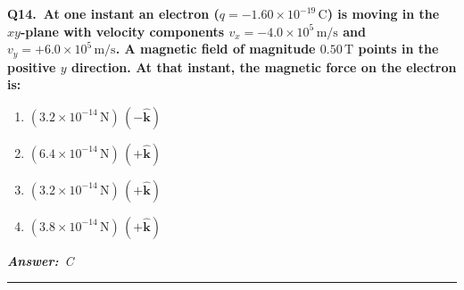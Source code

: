 \documentclass[11pt]{article}
\newcommand{\QuestionStyle}[1]{{\large\bfseries\boldmath #1}}
\newcommand{\AnswerStyle}[1]{{\large\bfseries\boldmath #1}}
\newcommand{\ReasonStyle}[1]{{\normalsize #1}}
\newif\ifshowreason
\newcommand{\Correct}[2]{%
  \item \AnswerStyle{\textcolor{AnsRed}{#1}}%
  \ifshowreason\\[-0.2em]
    \ReasonStyle{\textcolor{AnsRed}{#2}}%
  \fi
}
\newcommand{\Wrong}[2]{%
  \item \AnswerStyle{\textcolor{WrongBlue}{#1}}%
  \ifshowreason\\[-0.2em]
    \ReasonStyle{\textcolor{WrongBlue}{#2}}%
  \fi
}
\newcommand{\QBlock}[4]{%
  \Needspace{8\baselineskip}%
  \noindent
  \begin{minipage}{\linewidth}
    \QuestionStyle{#1.~#2}

    \vspace{0.25em}
    \begin{enumerate}
      #3
    \end{enumerate}

    \vspace{0.1em}
    \noindent\textcolor{AnsRed}{\textit{\textbf{Answer:}~#4}}

    \vspace{0.25em}
    \hrule height 0.4pt
  \end{minipage}
  \vspace{0.75em}
}
\begin{document}
\QBlock{Q14}{At one instant an electron ($q=-1.60\times10^{-19}\,\text{C}$) is moving in the $xy$-plane with velocity components $v_x=-4.0\times10^5\,\text{m/s}$ and $v_y=+6.0\times10^5\,\text{m/s}$. A magnetic field of magnitude $0.50\,\text{T}$ points in the positive $y$ direction. At that instant, the magnetic force on the electron is:}{
  \Wrong{$(3.2\times10^{-14}\,\text{N})\,(-\hat{\mathbf k})$}{This has the right magnitude but the wrong direction; it effectively treats the charge as positive or mishandles the sign of $v_x$.}
  \Wrong{$(6.4\times10^{-14}\,\text{N})\,(+\hat{\mathbf k})$}{This overestimates the magnitude (e.g., by using $v=\sqrt{v_x^2+v_y^2}$ instead of the perpendicular component $|v_x|$ to $\mathbf B$).}
  \Correct{$(3.2\times10^{-14}\,\text{N})\,(+\hat{\mathbf k})$}{The magnetic force is $\mathbf F=q\,\mathbf v\times\mathbf B$. With $\mathbf B=B\hat{\mathbf j}$ and $\mathbf v=v_x\hat{\mathbf i}+v_y\hat{\mathbf j}$, we have $\mathbf v\times\mathbf B=v_xB\,\hat{\mathbf k}$; since $v_x<0$, $\mathbf v\times\mathbf B$ points in $-\hat{\mathbf k}$, and multiplying by the electron's negative charge reverses it to $+\hat{\mathbf k}$. The magnitude is $|F|=|q||v_x|B=(1.60\times10^{-19})(4.0\times10^5)(0.50)=3.2\times10^{-14}\,\text{N}$.}
  \Wrong{$(3.8\times10^{-14}\,\text{N})\,(+\hat{\mathbf k})$}{This is a arithmetic/magnitude error; the correct magnitude from $|q||v_x|B$ is $3.2\times10^{-14}\,\text{N}$.}
}{C}
\end{document}
